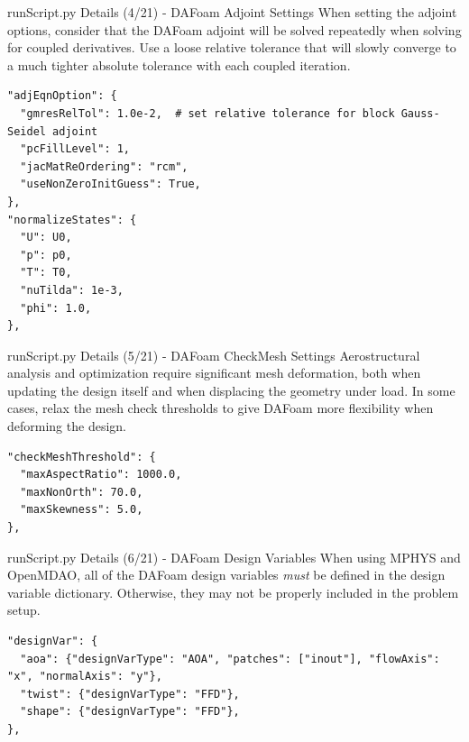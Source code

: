 \documentclass{bredelebeamer}
\begin{document}
\begin{frame}[fragile]{runScript.py Details (4/21) - \large DAFoam Adjoint Settings}
When setting the adjoint options, consider that the DAFoam adjoint will be solved repeatedly when solving for coupled derivatives. Use a loose relative tolerance that will slowly converge to a much tighter absolute tolerance with each coupled iteration.
\scriptsize
\lstset{ language=bash }
\begin{lstlisting}
"adjEqnOption": {
  "gmresRelTol": 1.0e-2,  # set relative tolerance for block Gauss-Seidel adjoint
  "pcFillLevel": 1,
  "jacMatReOrdering": "rcm",
  "useNonZeroInitGuess": True,
},
"normalizeStates": {
  "U": U0,
  "p": p0,
  "T": T0,
  "nuTilda": 1e-3,
  "phi": 1.0,
},
\end{lstlisting}
\normalsize
\end{frame}

\begin{frame}[fragile]{runScript.py Details (5/21) - \large DAFoam CheckMesh Settings}
Aerostructural analysis and optimization require significant mesh deformation, both when updating the design itself and when displacing the geometry under load. In some cases, relax the mesh check thresholds to give DAFoam more flexibility when deforming the design.
\scriptsize
\lstset{ language=bash }
\begin{lstlisting}
"checkMeshThreshold": {
  "maxAspectRatio": 1000.0,
  "maxNonOrth": 70.0,
  "maxSkewness": 5.0,
},
\end{lstlisting}
\normalsize
\end{frame}

\begin{frame}[fragile]{runScript.py Details (6/21) - \large DAFoam Design Variables}
When using MPHYS and OpenMDAO, all of the DAFoam design variables \textit{must} be defined in the design variable dictionary. Otherwise, they may not be properly included in the problem setup.
\scriptsize
\lstset{ language=bash }
\begin{lstlisting}
"designVar": {
  "aoa": {"designVarType": "AOA", "patches": ["inout"], "flowAxis": "x", "normalAxis": "y"},
  "twist": {"designVarType": "FFD"},
  "shape": {"designVarType": "FFD"},
},
\end{lstlisting}
\normalsize
\end{frame}
\end{document}
